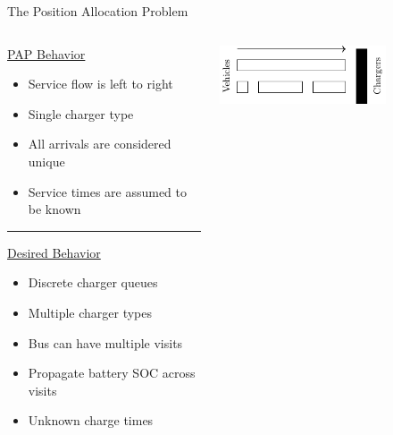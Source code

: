 \documentclass[aspectratio=169,dvipsnames]{beamer}
\begin{document}
\begin{frame}[label={sec:orgfde6e80}]{The Position Allocation Problem}
\begin{columns}
\begin{column}{0.5\columnwidth}
\begin{center} {\small \underline{PAP Behavior}}\end{center}

{\small
\begin{itemize}
\item Service flow is left to right
\item Single charger type
\item All arrivals are considered unique
\item Service times are assumed to be known
\end{itemize}
}

\noindent\rule{\textwidth}{0.5pt}

\begin{center} {\small \underline{Desired Behavior}}\end{center}

{\small
\begin{itemize}
\item Discrete charger queues
\item Multiple charger types
\item Bus can have multiple visits
\item Propagate battery SOC across visits
\item Unknown charge times
\end{itemize}
}
\end{column}

\begin{column}{0.5\columnwidth}
\begin{center}
\includegraphics[width=0.7\textwidth]{./img/pap.pdf}
\end{center}

\begin{figure}
  \centering
\end{figure}
\end{column}
\end{columns}
\end{frame}
\end{document}
